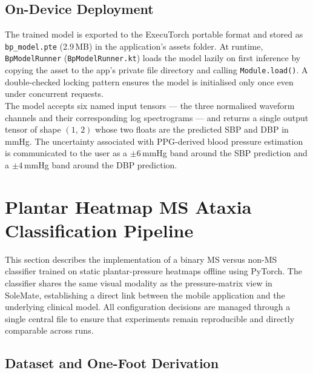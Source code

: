 \subsection{On-Device Deployment}
\label{subsubsec:bp_inference}

\noindent The trained model is exported to the ExecuTorch portable format and stored as
\texttt{bp\_model.pte} (2.9\,MB) in the application's assets folder.
At runtime, \texttt{BpModelRunner} (\texttt{BpModelRunner.kt}) loads the model lazily on
first inference by copying the asset to the app's private file directory and calling
\texttt{Module.load()}.
A double-checked locking pattern ensures the model is initialised only once even under
concurrent requests. \\

\noindent The model accepts six named input tensors — the three normalised waveform channels and their
corresponding log spectrograms — and returns a single output tensor of shape $(1,\,2)$ whose
two floats are the predicted SBP and DBP in mmHg.
The uncertainty associated with PPG-derived blood pressure estimation is communicated to the
user as a $\pm6$\,mmHg band around the SBP prediction and a $\pm4$\,mmHg band around the
DBP prediction. \\


\section{Plantar Heatmap MS Ataxia Classification Pipeline}
\label{sec:ataxia_ml}

This section describes the implementation of a binary MS versus non-MS classifier trained on static plantar-pressure heatmaps offline using PyTorch. The classifier shares the same visual modality as the pressure-matrix view in SoleMate, establishing a direct link between the mobile application and the underlying clinical model. All configuration decisions are managed through a single central file to ensure that experiments remain reproducible and directly comparable across runs.

\subsection{Dataset and One-Foot Derivation}
\label{subsec:ataxia_dataset}

